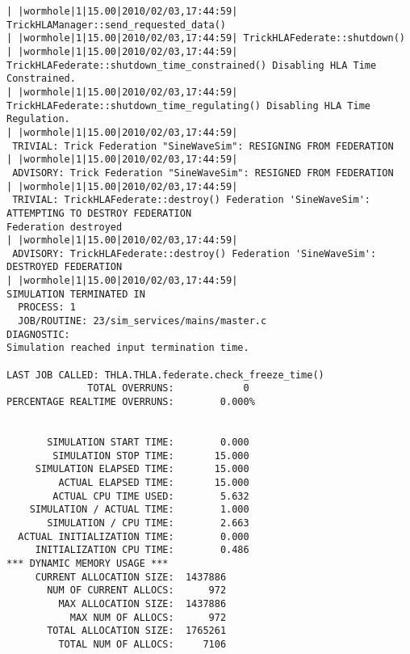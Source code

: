 \begin{lstlisting}[numbers=none,caption={output showing conditionally sent cyclic data}]
| |wormhole|1|15.00|2010/02/03,17:44:59| TrickHLAManager::send_requested_data()
| |wormhole|1|15.00|2010/02/03,17:44:59| TrickHLAFederate::shutdown()
| |wormhole|1|15.00|2010/02/03,17:44:59| TrickHLAFederate::shutdown_time_constrained() Disabling HLA Time Constrained.
| |wormhole|1|15.00|2010/02/03,17:44:59| TrickHLAFederate::shutdown_time_regulating() Disabling HLA Time Regulation.
| |wormhole|1|15.00|2010/02/03,17:44:59| 
 TRIVIAL: Trick Federation "SineWaveSim": RESIGNING FROM FEDERATION
| |wormhole|1|15.00|2010/02/03,17:44:59| 
 ADVISORY: Trick Federation "SineWaveSim": RESIGNED FROM FEDERATION
| |wormhole|1|15.00|2010/02/03,17:44:59| 
 TRIVIAL: TrickHLAFederate::destroy() Federation 'SineWaveSim': ATTEMPTING TO DESTROY FEDERATION
Federation destroyed
| |wormhole|1|15.00|2010/02/03,17:44:59| 
 ADVISORY: TrickHLAFederate::destroy() Federation 'SineWaveSim': DESTROYED FEDERATION
| |wormhole|1|15.00|2010/02/03,17:44:59| 
SIMULATION TERMINATED IN
  PROCESS: 1
  JOB/ROUTINE: 23/sim_services/mains/master.c
DIAGNOSTIC:
Simulation reached input termination time.

LAST JOB CALLED: THLA.THLA.federate.check_freeze_time()
              TOTAL OVERRUNS:            0
PERCENTAGE REALTIME OVERRUNS:        0.000%


       SIMULATION START TIME:        0.000
        SIMULATION STOP TIME:       15.000
     SIMULATION ELAPSED TIME:       15.000
         ACTUAL ELAPSED TIME:       15.000
        ACTUAL CPU TIME USED:        5.632
    SIMULATION / ACTUAL TIME:        1.000
       SIMULATION / CPU TIME:        2.663
  ACTUAL INITIALIZATION TIME:        0.000
     INITIALIZATION CPU TIME:        0.486
*** DYNAMIC MEMORY USAGE ***
     CURRENT ALLOCATION SIZE:  1437886
       NUM OF CURRENT ALLOCS:      972
         MAX ALLOCATION SIZE:  1437886
           MAX NUM OF ALLOCS:      972
       TOTAL ALLOCATION SIZE:  1765261
         TOTAL NUM OF ALLOCS:     7106
\end{lstlisting}
